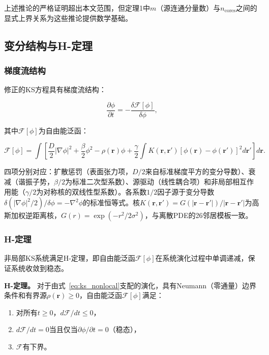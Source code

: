 \documentclass[sn-nature,pdflatex]{sn-jnl}
\begin{document}
上述推论的严格证明超出本文范围，但定理1中$m$（源连通分量数）与$n_{\text{cores}}$之间的显式上界关系为这些推论提供数学基础。

\subsection{变分结构与H-定理}

\subsubsection{梯度流结构}

修正的KS方程具有梯度流结构：

\begin{equation}
\label{eq:gradient_flow}
\frac{\partial \phi}{\partial t} = -\frac{\delta \mathcal{F}[\phi]}{\delta \phi},
\end{equation}

其中$\mathcal{F}[\phi]$为自由能泛函：

\begin{equation}
\label{eq:free_energy}
\mathcal{F}[\phi] = \int \left[ \frac{D}{2}|\nabla \phi|^2 + \frac{\beta}{2}\phi^2 - \rho(\mathbf{r})\phi + \frac{\gamma}{2} \int K(\mathbf{r}, \mathbf{r}')[\phi(\mathbf{r}) - \phi(\mathbf{r}')]^2 d\mathbf{r}' \right] d\mathbf{r}.
\end{equation}

四项分别对应：扩散惩罚（表面张力项，$D/2$来自标准梯度平方的变分导数）、衰减（谐振子势，$\beta/2$为标准二次型系数）、源驱动（线性耦合项）和非局部相互作用能（$\gamma/2$为对称核的双线性型系数）。各系数$1/2$因子源于变分导数$\delta(|\nabla\phi|^2/2)/\delta\phi = -\nabla^2\phi$的标准恒等式。核$K(\mathbf{r}, \mathbf{r}') = G(|\mathbf{r}-\mathbf{r}'|)/|\mathbf{r}-\mathbf{r}'|$为高斯加权逆距离核，$G(r)=\exp(-r^2/2\sigma^2)$，与离散PDE的26邻居模板一致。

\subsubsection{H-定理}

非局部KS系统满足H-定理，即自由能泛函$\mathcal{F}[\phi]$在系统演化过程中单调递减，保证系统收敛到稳态。

\noindent\textbf{H-定理。}
对于由式~\eqref{eq:ks_nonlocal}支配的演化，具有Neumann（零通量）边界条件和有界源$\rho(\mathbf{r}) \geq 0$，自由能泛函$\mathcal{F}[\phi]$满足：
\begin{enumerate}
  \item[(a)] 对所有$t \geq 0$，$d\mathcal{F}/dt \leq 0$，
  \item[(b)] $d\mathcal{F}/dt = 0$当且仅当$\partial\phi/\partial t = 0$（稳态），
  \item[(c)] $\mathcal{F}$有下界。
\end{enumerate}
\end{document}
